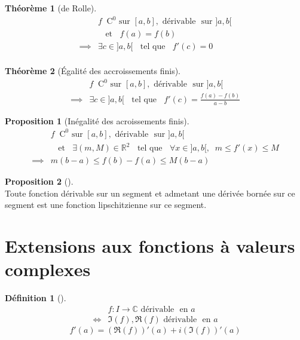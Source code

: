 \documentclass{article}
\newcommand{\R}{\mathbb{R}}
\newcommand{\C}{\mathbb{C}}
\newcommand{\et}{\;\;\text{ et }\;\;}
\newcommand{\tq}{\;\;\text{ tel que }\;\;}
\newcommand{\co}[1]{\mathrm{C^{#1}}}
\newcommand{\en}{\text{ en }}
\newcommand{\sur}{\text{ sur }}
\newcommand{\drv}{\text{ dérivable }}
\newcommand{\e}{\!\!}
\theoremstyle{definition}
\newtheorem*{prop}{Proposition}
\newtheorem*{defin}{Définition}
\theoremstyle{remark}
\theoremstyle{plain}
\newtheorem*{them}{Théorème}
\newenvironment{prp}[1][]
{\begin{prop}[#1]\quad\\}
{\end{prop}}
\newenvironment{dfn}[1][]
{\begin{defin}[#1]\quad\\}
{\end{defin}}
\newenvironment{thm}[1][]
{\begin{them}[#1]\quad\\}
{\end{them}}
\begin{document}
\begin{thm}[de Rolle]
\begin{align*}
            &f \;\; \co{0} \sur {[a, b]}, \drv \e \sur {]a, b[} \\
            &\et f(a) = f(b) \\
\implies    &\exists c \in {]a, b[} \tq f'(c) = 0 \\
\end{align*}
\end{thm}

\begin{thm}[\'Egalité des accroissements finis]
\begin{align*}
            &f \;\; \co{0} \sur {[a, b]}, \drv \e \sur {]a, b[} \\
\implies    &\exists c \in {]a, b[}
                \tq f'(c) = \frac{f(a) - f(b)}{a - b}
\end{align*}
\end{thm}

\begin{prp}[Inégalité des acroissements finis]
\begin{align*}
            &f \;\; \co{0} \sur {[a, b]}, \drv \e \sur {]a, b[} \\
            &\et \exists (m, M) \in \R^2 \tq \forall x \in {]a, b[}, \;\;
                m \leq f'(x) \leq M \\
\implies    &m(b - a) \leq f(b) - f(a) \leq M(b - a)
\end{align*}
\end{prp}

\begin{prp}
Toute fonction dérivable sur un segment et admetant une dérivée bornée
sur ce segment est une fonction lipschitzienne sur ce segment.
\end{prp}


\section{Extensions aux fonctions à valeurs complexes}

\begin{dfn}
\begin{align*}
        &f : I \to \C \drv \e \en a \\
\iff    &\Im(f), \Re(f) \drv \e \en a
\end{align*}
\[
    f'(a) = (\Re(f))'(a) + i(\Im(f))'(a) 
\]
\end{dfn}
\end{document}

